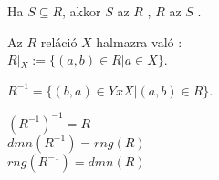 \begin{frame}
\begin{tcolorbox}[title={Def.: Leszűkítés, kierjesztés}]
Ha $S \subseteq R$, akkor $S$ az $R$ , $R$ az $S$ .
\end{tcolorbox}

\begin{tcolorbox}[title={Def.: Az $R$ reláció $X$ halmazra való Leszűkítése}]
Az $R$ reláció $X$ halmazra való :\\
$R|_X := \{(a, b) \in R | a \in X \}$.
\end{tcolorbox}

\begin{tcolorbox}[title={Def.: Ar $r \subseteq X x Y$ reláció inverze}]
$R^{-1} = \{(b, a) \in Y x X | (a, b) \in R \}$.
\end{tcolorbox}

\begin{tcolorbox}[title={Ész}]
$(R^{-1})^{-1} = R$\\
$dmn(R^{-1}) = rng(R)$\\
$rng(R^{-1}) = dmn(R)$\\
\end{tcolorbox}
\end{frame}

